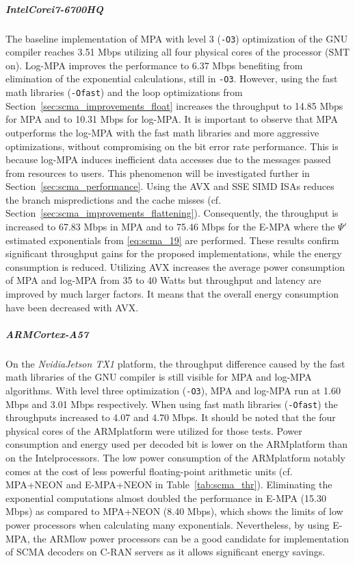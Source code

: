\subparagraph{Intel\R Core\TM i7-6700HQ}

The baseline implementation of MPA with level 3 (\verb|-O3|) optimization of the
GNU compiler reaches 3.51 Mbps utilizing all four physical cores of the
processor (SMT on). Log-MPA improves the performance to 6.37 Mbps benefiting
from elimination of the exponential calculations, still in \verb|-O3|. However,
using the fast math libraries (\verb|-Ofast|) and the loop optimizations from
Section~\ref{sec:scma_improvements_float} increases the throughput to 14.85 Mbps
for MPA and to 10.31 Mbps for log-MPA. It is important to observe that MPA
outperforms the log-MPA with the fast math libraries and more aggressive
optimizations, without compromising on the bit error rate performance. This is
because log-MPA induces inefficient data accesses due to the messages passed
from resources to users. This phenomenon will be investigated further in
Section~\ref{sec:scma_performance}. Using the AVX and SSE SIMD ISAs reduces the
branch mispredictions and the cache misses (cf.
Section~\ref{sec:scma_improvements_flattening}). Consequently, the throughput is
increased to 67.83 Mbps in MPA and to 75.46 Mbps for the E-MPA where the $\Psi'$
estimated exponentials from \eqref{eq:scma_19} are performed. These results
confirm significant throughput gains for the proposed implementations, while the
energy consumption is reduced. Utilizing AVX increases the average power
consumption of MPA and log-MPA from 35 to 40 Watts but throughput and latency
are improved by much larger factors. It means that the overall energy
consumption have been decreased with AVX.

\subparagraph{ARM\TM Cortex-A57}

On the \emph{Nvidia\R Jetson TX1} platform, the throughput difference caused by
the fast math libraries of the GNU compiler is still visible for MPA and log-MPA
algorithms. With level three optimization (\verb|-O3|), MPA and log-MPA run at
1.60 Mbps and 3.01 Mbps respectively. When using fast math libraries
(\verb|-Ofast|) the throughputs increased to 4.07 and 4.70 Mbps. It should be
noted that the four physical cores of the ARM\R platform were  utilized for
those tests. Power consumption and energy used per decoded bit is lower on the
ARM\R platform than on the Intel\R processors. The low power consumption of the
ARM\R platform notably comes at the cost of less powerful floating-point
arithmetic units (cf. MPA+NEON and E-MPA+NEON in Table~\ref{tab:scma_thr}).
Eliminating the exponential computations almost doubled the performance in E-MPA
(15.30 Mbps) as compared to MPA+NEON (8.40 Mbps), which shows the limits of low
power processors when calculating many exponentials. Nevertheless, by using
E-MPA, the ARM\R low power processors can be a good candidate for implementation
of SCMA decoders on C-RAN servers as it allows significant energy savings.

